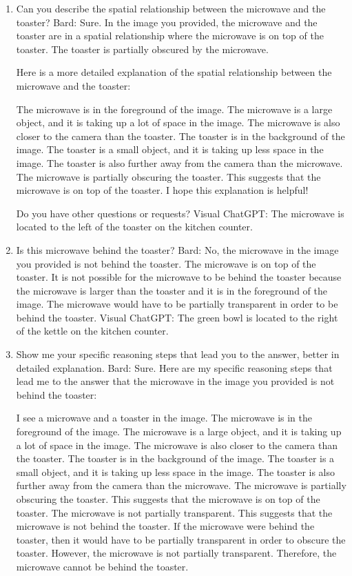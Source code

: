 \begin{enumerate}
    \item Can you describe the spatial relationship between the microwave and the toaster?
    \subitem Bard: Sure. In the image you provided, the microwave and the toaster are in a spatial relationship where the microwave is on top of the toaster. The toaster is partially obscured by the microwave.

    Here is a more detailed explanation of the spatial relationship between the microwave and the toaster:
    
    The microwave is in the foreground of the image. The microwave is a large object, and it is taking up a lot of space in the image. The microwave is also closer to the camera than the toaster.
    The toaster is in the background of the image. The toaster is a small object, and it is taking up less space in the image. The toaster is also further away from the camera than the microwave.
    The microwave is partially obscuring the toaster. This suggests that the microwave is on top of the toaster.
    I hope this explanation is helpful!
    
    Do you have other questions or requests?
    \subitem Visual ChatGPT: The microwave is located to the left of the toaster on the kitchen counter.
    \item Is this microwave behind the toaster?
    \subitem Bard: 
    No, the microwave in the image you provided is not behind the toaster. The microwave is on top of the toaster. It is not possible for the microwave to be behind the toaster because the microwave is larger than the toaster and it is in the foreground of the image. The microwave would have to be partially transparent in order to be behind the toaster.
    \subitem Visual ChatGPT: The green bowl is located to the right of the kettle on the kitchen counter.
    \item Show me your specific reasoning steps that lead you to the answer, better in detailed explanation.
    \subitem Bard: 
    Sure. Here are my specific reasoning steps that lead me to the answer that the microwave in the image you provided is not behind the toaster:

    I see a microwave and a toaster in the image.
    The microwave is in the foreground of the image. The microwave is a large object, and it is taking up a lot of space in the image. The microwave is also closer to the camera than the toaster.
    The toaster is in the background of the image. The toaster is a small object, and it is taking up less space in the image. The toaster is also further away from the camera than the microwave.
    The microwave is partially obscuring the toaster. This suggests that the microwave is on top of the toaster.
    The microwave is not partially transparent. This suggests that the microwave is not behind the toaster.
    If the microwave were behind the toaster, then it would have to be partially transparent in order to obscure the toaster. However, the microwave is not partially transparent. Therefore, the microwave cannot be behind the toaster.


\end{enumerate}
